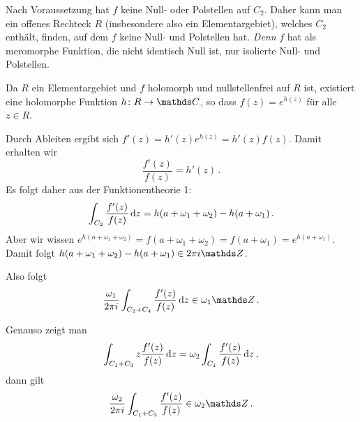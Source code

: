 \begin{bewe-list}
Nach Voraussetzung hat $f$ keine Null- oder Polstellen auf $C_2$. Daher kann man ein offenes Rechteck $R$ (insbesondere also ein Elementargebiet), welches $C_2$ enthält, finden, auf dem $f$ keine Null- und Polstellen hat. \emph{Denn} $f$ hat als meromorphe Funktion, die nicht identisch Null ist, nur isolierte Null- und Polstellen.

Da $R$ ein Elementargebiet und $f$ holomorph und nullstellenfrei auf $R$ ist, existiert eine holomorphe Funktion $h\colon R \ra \CC$, so dass $f(z) = e^{h(z)}$ für alle $z\in R$.

Durch Ableiten ergibt sich $f'(z) = h'(z) e^{h(z)} = h'(z)f(z)$. Damit erhalten wir
\[
	\frac{f'(z)}{f(z)}
	= h'(z)
	\,.
\]
Es folgt daher aus der Funktionentheorie 1:
\[
	\int_{C_2} \frac{f'(z)}{f(z)} \,\mathrm{d} z
	= h(a+\omega_1+\omega_2) - h(a + \omega_1)
	\,.
\]
Aber wir wissen $e^{h(a+\omega_1+\omega_2)} = f(a+\omega_1+\omega_2) = f(a+\omega_1) = e^{h(a + \omega_1)}$. Damit folgt $h(a+\omega_1+\omega_2) - h(a + \omega_1) \in 2\pi i \ZZ$.

Also folgt
\[
	\frac{\omega_1}{2\pi i} \int_{C_2+ C_4} \frac{f'(z)}{f(z)} \opd z \in \omega_1\ZZ
	\,.
\]

Genauso zeigt man
\[
	\int_{C_1 + C_3} z\frac{f'(z)}{f(z)} \,\mathrm{d} z
	= \omega_2 \int_{C_1} \frac{f'(z)}{f(z)} \,\mathrm{d} z
	\,,
\]
dann gilt
\[
	\frac{\omega_2}{2\pi i} \int_{C_1 + C_3} \frac{f'(z)}{f(z)} \in \omega_2\ZZ
	\,.
\]
\end{bewe-list}